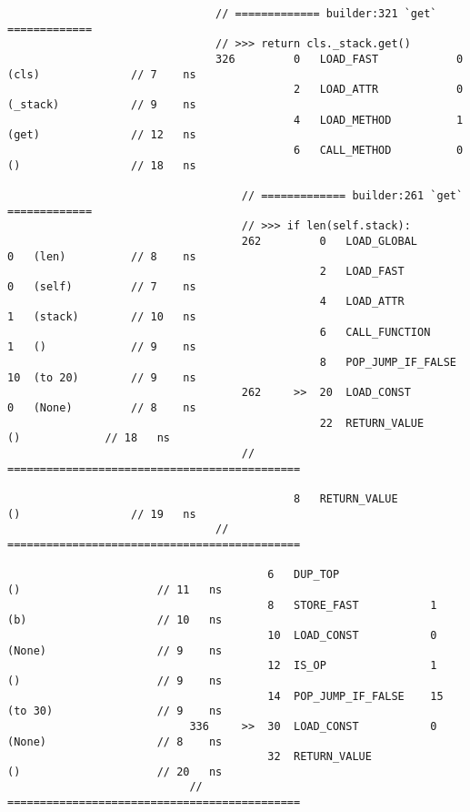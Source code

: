 \begin{code}
\begin{verbatim}
                                // ============= builder:321 `get` =============
                                // >>> return cls._stack.get()
                                326         0   LOAD_FAST            0   (cls)              // 7    ns
                                            2   LOAD_ATTR            0   (_stack)           // 9    ns
                                            4   LOAD_METHOD          1   (get)              // 12   ns
                                            6   CALL_METHOD          0   ()                 // 18   ns

                                    // ============= builder:261 `get` =============
                                    // >>> if len(self.stack):
                                    262         0   LOAD_GLOBAL          0   (len)          // 8    ns
                                                2   LOAD_FAST            0   (self)         // 7    ns
                                                4   LOAD_ATTR            1   (stack)        // 10   ns
                                                6   CALL_FUNCTION        1   ()             // 9    ns
                                                8   POP_JUMP_IF_FALSE    10  (to 20)        // 9    ns
                                    262     >>  20  LOAD_CONST           0   (None)         // 8    ns
                                                22  RETURN_VALUE             ()             // 18   ns
                                    // =============================================

                                            8   RETURN_VALUE             ()                 // 19   ns
                                // =============================================

                                        6   DUP_TOP                  ()                     // 11   ns
                                        8   STORE_FAST           1   (b)                    // 10   ns
                                        10  LOAD_CONST           0   (None)                 // 9    ns
                                        12  IS_OP                1   ()                     // 9    ns
                                        14  POP_JUMP_IF_FALSE    15  (to 30)                // 9    ns
                            336     >>  30  LOAD_CONST           0   (None)                 // 8    ns
                                        32  RETURN_VALUE             ()                     // 20   ns
                            // =============================================


\end{verbatim}
\end{code}
